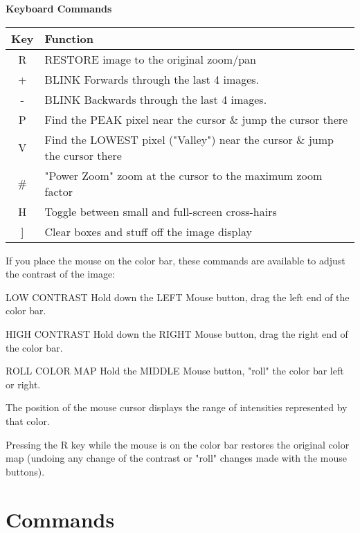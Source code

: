 \documentclass[10pt]{report}
\renewcommand{\[}{\begin{eqnarray}}
\renewcommand{\]}{\end{eqnarray}}
\newenvironment{example}{
        \begin{list}{}{
                \labelsep=0.25in
                \labelwidth=2.0in
                \leftmargin=2.75in
                \itemindent=0in
                \itemsep=0in
                \parsep=0in
        }
}{
        \end{list}
}
\begin{document}
\begin{center}
{\bf Keyboard Commands}\\
\begin{tabular}{cl}
\hline
Key & Function\\
\hline
 R &RESTORE image to the original zoom/pan\\
 + &BLINK Forwards through the last 4 images.\\
 - &BLINK Backwards through the last 4 images.\\
 P &Find the PEAK pixel near the cursor \& jump the cursor there\\
 V &Find the LOWEST pixel ("Valley") near the cursor \& jump the cursor there\\
 \# &"Power Zoom" zoom at the cursor to the maximum zoom factor\\
 H &Toggle between small and full-screen cross-hairs\\
 ] &Clear boxes and stuff off the image display\\
\hline
\end{tabular}
\end{center}


If you place the mouse on the color bar, these commands are available
to adjust the contrast of the image:
\begin{example}
  \item[LOW CONTRAST]{Hold down the LEFT Mouse button, drag the left
       end of the color bar.}

  \item[HIGH CONTRAST]{Hold down the RIGHT Mouse button, drag the right
       end of the color bar.}

  \item[ROLL COLOR MAP]{Hold the MIDDLE Mouse button, "roll" the
       color bar left or right.}
\end{example}
The position of the mouse cursor displays the range of intensities
represented by that color.

Pressing the R key while the mouse is on the color bar restores the
original color map (undoing any change of the contrast or "roll" changes
made with the mouse buttons).


\section{Commands}
\end{document}

